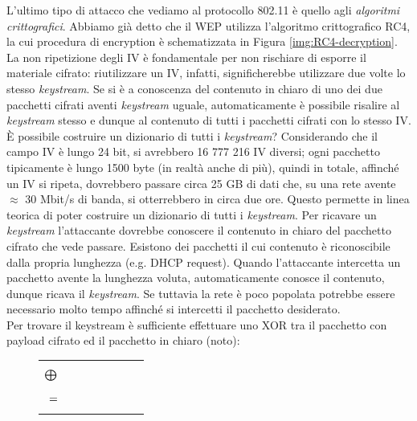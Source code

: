L'ultimo tipo di attacco che vediamo al protocollo 802.11 è quello agli \textit{algoritmi crittografici}. Abbiamo già detto che il WEP utilizza l'algoritmo crittografico RC4, la cui procedura di encryption è schematizzata in Figura \ref{img:RC4-decryption}. La non ripetizione degli IV è fondamentale per non rischiare di esporre il materiale cifrato: riutilizzare un IV, infatti, significherebbe utilizzare due volte lo stesso \textit{keystream}. Se si è a conoscenza del contenuto in chiaro di uno dei due pacchetti cifrati aventi \textit{keystream} uguale, automaticamente è possibile risalire al \textit{keystream} stesso e dunque al contenuto di tutti i pacchetti cifrati con lo stesso IV. È possibile costruire un dizionario di tutti i \textit{keystream}? Considerando che il campo IV è lungo 24 bit, si avrebbero 16 777 216 IV diversi; ogni pacchetto tipicamente è lungo 1500 byte (in realtà anche di più), quindi in totale, affinché un IV si ripeta, dovrebbero passare circa 25 GB di dati che, su una rete avente $\approx$ 30 Mbit/s di banda, si otterrebbero in circa due ore. Questo permette in linea teorica di poter costruire un dizionario di tutti i \textit{keystream}. Per ricavare un \textit{keystream} l'attaccante dovrebbe conoscere il contenuto in chiaro del pacchetto cifrato che vede passare. Esistono dei pacchetti il cui contenuto è riconoscibile dalla propria lunghezza (e.g. DHCP request). Quando l'attaccante intercetta un pacchetto avente la lunghezza voluta, automaticamente conosce il contenuto, dunque ricava il \textit{keystream}. Se tuttavia la rete è poco popolata potrebbe essere necessario molto tempo affinché si intercetti il pacchetto desiderato.\\
Per trovare il keystream è sufficiente effettuare uno XOR tra il pacchetto con payload cifrato ed il pacchetto in chiaro (noto):
\begin{figure}[htbp]
	\centering
	\begin{tabular}{r}
		{\begin{bytefield}{24}\bitbox{8}{Header}\bitbox{16}{Payload cifrato}\end{bytefield}}\\
		$\bigoplus\hspace{2.5cm}$\\
		{\begin{bytefield}{16}\bitbox{16}{Pacchetto in chiaro (noto)}\end{bytefield}}\\
		$=\hspace{2.5cm}$\\
		{\begin{bytefield}{16}\bitbox{16}{Keystream}\end{bytefield}}\\
	\end{tabular}
\end{figure}\\
